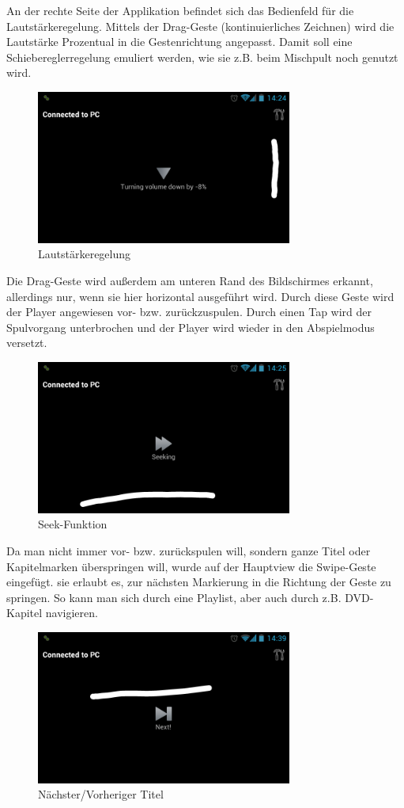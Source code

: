 \documentclass[a4paper,12pt]{article}
\begin{document}
An der rechte Seite der Applikation befindet sich das Bedienfeld für die Lautstärkeregelung. Mittels der Drag-Geste (kontinuierliches Zeichnen) wird die Lautstärke Prozentual in die Gestenrichtung angepasst. Damit soll eine Schiebereglerregelung emuliert werden, wie sie z.B. beim Mischpult noch genutzt wird. 
\begin{figure}[H]
\centering
\includegraphics[width=0.75\textwidth]{Screenshot_9.png}
\caption{Lautstärkeregelung}
\end{figure}
Die Drag-Geste wird außerdem am unteren Rand des Bildschirmes erkannt, allerdings nur, wenn sie hier horizontal ausgeführt wird. Durch diese Geste wird der Player angewiesen vor- bzw. zurückzuspulen. Durch einen Tap wird der Spulvorgang unterbrochen und der Player wird wieder in den Abspielmodus versetzt.
\begin{figure}[H]
\centering
\includegraphics[width=0.75\textwidth]{Screenshot_10.png}
\caption{Seek-Funktion}
\end{figure}
Da man nicht immer vor- bzw. zurückspulen will, sondern ganze Titel oder Kapitelmarken überspringen will, wurde auf der Hauptview die Swipe-Geste eingefügt. sie erlaubt es, zur nächsten Markierung in die Richtung der Geste zu springen. So kann man sich durch eine Playlist, aber auch durch z.B. DVD-Kapitel navigieren.
\begin{figure}[H]
\centering
\includegraphics[width=0.75\textwidth]{Screenshot_11.png}
\caption{Nächster/Vorheriger Titel}
\end{figure}
\end{document}
